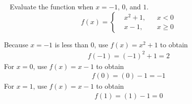 \begin{example}~\newline
	Evaluate the function when $x=-1$, $0$, and $1$. \cite{ci}
	\begin{equation}
		f(x)=\left\{
		\begin{aligned} 
			  & x^2+1, &   & x < 0    \\
			  & x-1,   &   & x \geq 0
		\end{aligned}\right.
	\end{equation}
	\begin{solution} Because $x=-1$ is less than 0, use $f(x)=x^2+1$ 
		to obtain
		\begin{align}f(-1) = (-1)^2+1 = 2\end{align}
		For $x=0$, use $f(x) = x-1$ to obtain
		\begin{align}f(0) = (0)-1 = -1\end{align}
		For $x=1$, use $f(x) = x-1$ to obtain
		\begin{align}f(1) = (1)-1 = 0\end{align}
	\end{solution}
\end{example}


